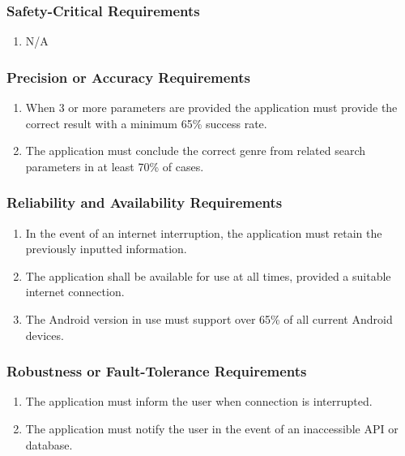 \documentclass[12pt]{article}
\begin{document}
    \subsubsection{Safety-Critical Requirements}
    \label{ssub:safety_critical_requirements}
    \begin{enumerate}[{PR-SC}1. ]
        \item N/A
    \end{enumerate}
    
    \subsubsection{Precision or Accuracy Requirements}
    \label{ssub:precision_or_accuracy_requirements}
    \begin{enumerate}[{PR-PA}1. ]
        \item When 3 or more parameters are provided the application must provide the correct result with a minimum 65\% success rate.
        \item The application must conclude the correct genre from related search parameters in at least 70\% of cases.  
    \end{enumerate}
    
    \subsubsection{Reliability and Availability Requirements}
    \label{ssub:reliability_and_availability_requirements}
    \begin{enumerate}[{PR-RA}1. ]
        \item In the event of an internet interruption, the application must retain the previously inputted information.
        \item The application shall be available for use at all times, provided a suitable internet connection.
        \item The Android version in use must support over 65\% of all current Android devices.
    \end{enumerate}
    
    \subsubsection{Robustness or Fault-Tolerance Requirements}
    \label{ssub:robustness_or_fault_tolerance_requirements}
    \begin{enumerate}[{PR-FT}1. ]
        \item The application must inform the user when connection is interrupted.
        \item The application must notify the user in the event of an inaccessible API or database.
    \end{enumerate}
    
\end{document}
